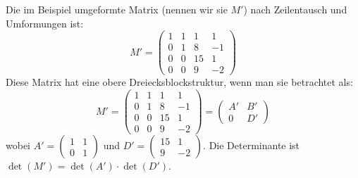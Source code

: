 Die im Beispiel umgeformte Matrix (nennen wir sie $M'$) nach Zeilentausch und
Umformungen ist:
\[
    M' = \begin{pmatrix}
        1 & 1 & 1  & 1  \\
        0 & 1 & 8  & -1 \\
        0 & 0 & 15 & 1  \\
        0 & 0 & 9  & -2
    \end{pmatrix}
\]
Diese Matrix hat eine obere Dreiecksblockstruktur, wenn man sie betrachtet als:
\[
    M' = \left( \begin{array}{cc|cc}
            1 & 1 & 1  & 1  \\
            0 & 1 & 8  & -1 \\
            \hline
            0 & 0 & 15 & 1  \\
            0 & 0 & 9  & -2
        \end{array} \right)
    = \begin{pmatrix} A' & B' \\ 0 & D' \end{pmatrix}
\]
wobei $A' = \begin{pmatrix} 1 & 1 \\ 0 & 1 \end{pmatrix}$ und $D' = \begin{pmatrix} 15 & 1 \\ 9 & -2 \end{pmatrix}$.
Die Determinante ist $\det(M') = \det(A') \cdot \det(D')$.

\bigskip

